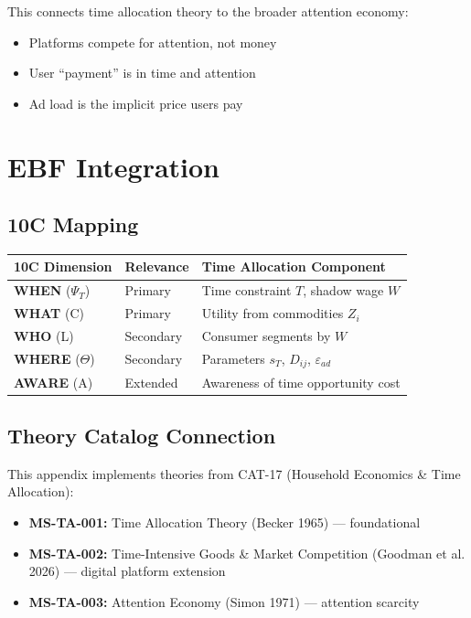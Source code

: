 This connects time allocation theory to the broader attention economy:
\begin{itemize}
\item Platforms compete for attention, not money
\item User ``payment'' is in time and attention
\item Ad load is the implicit price users pay
\end{itemize}

\section{EBF Integration}
\label{sec:pt-ebf-integration}

\subsection{10C Mapping}

\begin{center}
\begin{tabular}{lll}
\toprule
10C Dimension & Relevance & Time Allocation Component \\
\midrule
\textbf{WHEN} ($\Psi_T$) & Primary & Time constraint $T$, shadow wage $W$ \\
\textbf{WHAT} (C) & Primary & Utility from commodities $Z_i$ \\
\textbf{WHO} (L) & Secondary & Consumer segments by $W$ \\
\textbf{WHERE} ($\Theta$) & Secondary & Parameters $s_T$, $D_{ij}$, $\varepsilon_{ad}$ \\
\textbf{AWARE} (A) & Extended & Awareness of time opportunity cost \\
\bottomrule
\end{tabular}
\end{center}

\subsection{Theory Catalog Connection}

This appendix implements theories from CAT-17 (Household Economics \& Time Allocation):

\begin{itemize}
\item \textbf{MS-TA-001:} Time Allocation Theory (Becker 1965) --- foundational
\item \textbf{MS-TA-002:} Time-Intensive Goods \& Market Competition (Goodman et al. 2026) --- digital platform extension
\item \textbf{MS-TA-003:} Attention Economy (Simon 1971) --- attention scarcity
\end{itemize}

